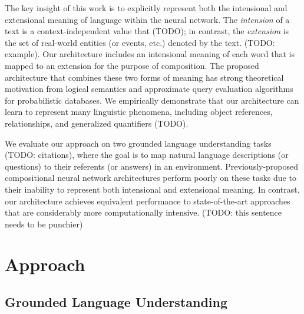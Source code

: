 \documentclass[11pt,letterpaper]{article}
\begin{document}
The key insight of this work is to explicitly represent both the
intensional and extensional meaning of language within the neural
network. The \emph{intension} of a text is a context-independent value
that (TODO); in contrast, the \emph{extension} is the set of
real-world entities (or events, etc.) denoted by the text. (TODO:
example). Our architecture includes an intensional meaning of each
word that is mapped to an extension for the purpose of
composition. The proposed architecture that combines these two forms
of meaning has strong theoretical motivation from logical semantics
and approximate query evaluation algorithms for probabilistic
databases. We empirically demonstrate that our architecture can learn
to represent many linguistic phenomena, including object references,
relationships, and generalized quantifiers (TODO).



We evaluate our approach on two grounded language understanding tasks
(TODO: citations), where the goal is to map natural language
descriptions (or questions) to their referents (or answers) in an
environment. Previously-proposed compositional neural network
architectures perform poorly on these tasks due to their inability to
represent both intensional and extensional meaning. In contrast, our
architecture achieves equivalent performance to state-of-the-art
approaches that are considerably more computationally
intensive. (TODO: this sentence needs to be punchier)


\section{Approach}

\subsection{Grounded Language Understanding}
\end{document}
